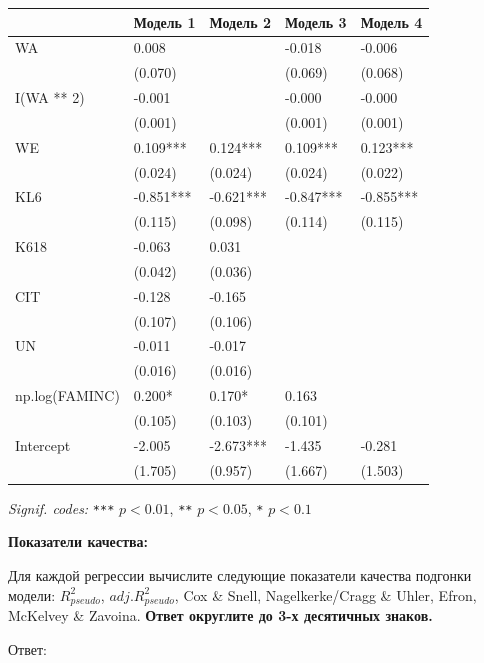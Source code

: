 \documentclass[
  russian,
]{article}
\newcounter{none} %
\begin{document}
{\def\LTcaptype{none} %
\begin{longtable}[]{@{}lllll@{}}
\toprule\noalign{}
& Модель 1 & Модель 2 & Модель 3 & Модель 4 \\
\midrule\noalign{}
\endhead
\bottomrule\noalign{}
\endlastfoot
WA & 0.008 & & -0.018 & -0.006 \\
& (0.070) & & (0.069) & (0.068) \\
I(WA ** 2) & -0.001 & & -0.000 & -0.000 \\
& (0.001) & & (0.001) & (0.001) \\
WE & 0.109*** & 0.124*** & 0.109*** & 0.123*** \\
& (0.024) & (0.024) & (0.024) & (0.022) \\
KL6 & -0.851*** & -0.621*** & -0.847*** & -0.855*** \\
& (0.115) & (0.098) & (0.114) & (0.115) \\
K618 & -0.063 & 0.031 & & \\
& (0.042) & (0.036) & & \\
CIT & -0.128 & -0.165 & & \\
& (0.107) & (0.106) & & \\
UN & -0.011 & -0.017 & & \\
& (0.016) & (0.016) & & \\
np.log(FAMINC) & 0.200* & 0.170* & 0.163 & \\
& (0.105) & (0.103) & (0.101) & \\
Intercept & -2.005 & -2.673*** & -1.435 & -0.281 \\
& (1.705) & (0.957) & (1.667) & (1.503) \\
\end{longtable}
}

\emph{Signif. codes:} \texttt{***} \(p<0.01\), \texttt{**} \(p<0.05\),
\texttt{*} \(p<0.1\)

\textbf{Показатели качества:}

Для каждой регрессии вычислите следующие показатели качества подгонки
модели: \(R^2_{pseudo}\), \(adj.R^2_{pseudo}\), Cox \& Snell,
Nagelkerke/Cragg \& Uhler, Efron, McKelvey \& Zavoina. \textbf{Ответ
округлите до 3-х десятичных знаков.}

Ответ:
\end{document}
